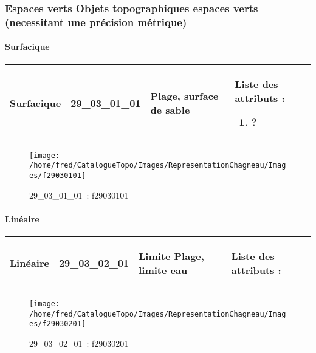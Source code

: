 \documentclass[12pt,titlepage]{book}
\begin{document}
\subsubsection{\large Espaces verts Objets topographiques espaces verts (necessitant une précision métrique)}
\paragraph{Surfacique}
\noindent
\vspace{\baselineskip}

\renewcommand{\arraystretch}{1.2}
\begin{supertabular}{|p{10cm}|c|p{13cm}|p{12cm}|}
 Surfacique & 29\_03\_01\_01 & Plage, surface de sable & Liste des attributs :
\begin{enumerate}
  \item ?\end{enumerate}
\\
\hline
\end{supertabular}
\begin{figure}[h!]
  \hfill         %
  \begin{minipage}[t]{3cm}
    \begin{center}
      \texttt{[image: /home/fred/CatalogueTopo/Images/RepresentationChagneau/Images/f29030101]}
      \caption[~29\_03\_01\_01]{\small{29\_03\_01\_01~:} \tiny{f29030101}}\label{f29030101}
    \end{center}
  \end{minipage}
\end{figure}


\paragraph{Linéaire}
\noindent
\vspace{\baselineskip}

\renewcommand{\arraystretch}{1.2}
\begin{supertabular}{|p{10cm}|c|p{13cm}|p{12cm}|}
 Linéaire & 29\_03\_02\_01 & Limite Plage, limite eau & Liste des attributs :
\begin{enumerate}
\end{enumerate}
\\
\hline
\end{supertabular}
\begin{figure}[h!]
  \hfill         %
  \begin{minipage}[t]{3cm}
    \begin{center}
      \texttt{[image: /home/fred/CatalogueTopo/Images/RepresentationChagneau/Images/f29030201]}
      \caption[~29\_03\_02\_01]{\small{29\_03\_02\_01~:} \tiny{f29030201}}\label{f29030201}
    \end{center}
  \end{minipage}
\end{figure}
\end{document}
